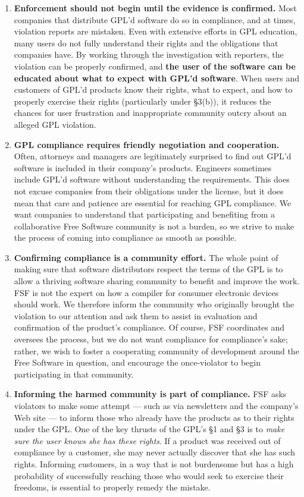 \begin{enumerate}

\item {\bf Enforcement should not begin until the evidence is confirmed.}
  Most companies that distribute GPL'd software do so in compliance, and at
  times, violation reports are mistaken. Even with extensive efforts in
  GPL education, many users do not fully understand their rights and the
  obligations that companies have. By working through the investigation
  with reporters, the violation can be properly confirmed, and {\bf the
    user of the software can be educated about what to expect with GPL'd
    software}. When users and customers of GPL'd products know their
  rights, what to expect, and how to properly exercise their rights
  (particularly under \S 3(b)), it reduces the chances for user
  frustration and inappropriate community outcry about an alleged GPL
  violation.

\item {\bf GPL compliance requires friendly negotiation and cooperation.}
  Often, attorneys and managers are legitimately surprised to find out
  GPL'd software is included in their company's products. Engineers
  sometimes include GPL'd software without understanding the requirements.
  This does not excuse companies from their obligations under the license,
  but it does mean that care and patience are essential for reaching GPL
  compliance. We want companies to understand that participating and
  benefiting from a collaborative Free Software community is not a burden,
  so we strive to make the process of coming into compliance as smooth as
  possible.

\item {\bf Confirming compliance is a community effort.}  The whole point
  of making sure that software distributors respect the terms of the GPL is to
  allow a thriving software sharing community to benefit and improve the
  work. FSF is not the expert on how a compiler for consumer electronic
  devices should work. We therefore inform the community who originally
  brought the violation to our attention and ask them to assist in
  evaluation and confirmation of the product's compliance. Of course, FSF
  coordinates and oversees the process, but we do not want compliance for
  compliance's sake; rather, we wish to foster a cooperating community of
  development around the Free Software in question, and encourage the
  once-violator to begin participating in that community.

\item {\bf Informing the harmed community is part of compliance.} FSF asks
  violators to make some attempt --- such as via newsletters and the
  company's Web site --- to inform those who already have the products as
  to their rights under the GPL\@. One of the key thrusts of the GPL's \S 1 and
  \S 3 is to {\em make sure the user knows she has these rights\/}. If a
  product was received out of compliance by a customer, she may never
  actually discover that she has such rights. Informing customers, in a
  way that is not burdensome but has a high probability of successfully
  reaching those who would seek to exercise their freedoms, is essential
  to properly remedy the mistake.


\end{enumerate}
